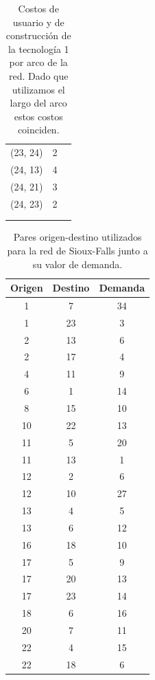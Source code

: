 \documentclass{article}
\begin{document}
\begin{table}[h!]
\begin{tabular}{ccc}
        (23, 24) & 2 \\
        (24, 13) & 4 \\
        (24, 21) & 3 \\
        (24, 23) & 2 \\
         & \\
         & \\
      \bottomrule
    \end{tabular}
    \caption{Costos de usuario y de construcción de la tecnología 1 por arco de la red. Dado que utilizamos el largo del arco estos costos coinciden.}\label{table:siouxfallsgraphdata}
  \end{table}

  \begin{table}[h!]
    \centering
    \begin{tabular}{ccc}
      \toprule
        Origen & Destino & Demanda \\
      \midrule
        1 & 7 & 34 \\
        1 & 23 & 3 \\
        2 & 13 & 6 \\
        2 & 17 & 4 \\
        4 & 11 & 9 \\
        6 & 1 & 14 \\
        8 & 15 & 10 \\
        10 & 22 & 13 \\
        11 & 5 & 20 \\
        11 & 13 & 1 \\
        12 & 2 & 6 \\
        12 & 10 & 27 \\
        13 & 4 & 5 \\
        13 & 6 & 12 \\
        16 & 18 & 10 \\
        17 & 5 & 9 \\
        17 & 20 & 13 \\
        17 & 23 & 14 \\
        18 & 6 & 16 \\
        20 & 7 & 11 \\
        22 & 4 & 15 \\
        22 & 18 & 6 \\
      \bottomrule
    \end{tabular}
    \caption{Pares origen-destino utilizados para la red de Sioux-Falls junto a su valor de demanda.}\label{table:siouxfallsdemanddata}
  \end{table}

  \FloatBarrier
  \printbibliography
\end{document}
